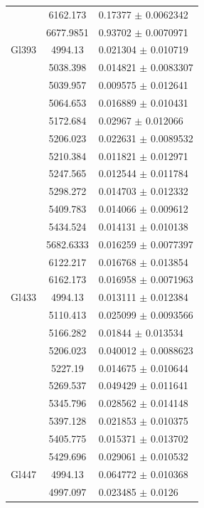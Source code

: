 \begin{longtable}{|c|c|l|}
 & 6162.173 & 0.17377 $\pm$ 0.0062342 \\        
 & 6677.9851 & 0.93702 $\pm$ 0.0070971 \\       
\hline                                          
Gl393 & 4994.13 & 0.021304 $\pm$ 0.010719 \\    
 & 5038.398 & 0.014821 $\pm$ 0.0083307 \\       
 & 5039.957 & 0.009575 $\pm$ 0.012641 \\        
 & 5064.653 & 0.016889 $\pm$ 0.010431 \\        
 & 5172.684 & 0.02967 $\pm$ 0.012066 \\         
 & 5206.023 & 0.022631 $\pm$ 0.0089532 \\       
 & 5210.384 & 0.011821 $\pm$ 0.012971 \\        
 & 5247.565 & 0.012544 $\pm$ 0.011784 \\        
 & 5298.272 & 0.014703 $\pm$ 0.012332 \\        
 & 5409.783 & 0.014066 $\pm$ 0.009612 \\        
 & 5434.524 & 0.014131 $\pm$ 0.010138 \\        
 & 5682.6333 & 0.016259 $\pm$ 0.0077397 \\      
 & 6122.217 & 0.016768 $\pm$ 0.013854 \\        
 & 6162.173 & 0.016958 $\pm$ 0.0071963 \\       
\hline                                          
Gl433 & 4994.13 & 0.013111 $\pm$ 0.012384 \\    
 & 5110.413 & 0.025099 $\pm$ 0.0093566 \\       
 & 5166.282 & 0.01844 $\pm$ 0.013534 \\         
 & 5206.023 & 0.040012 $\pm$ 0.0088623 \\       
 & 5227.19 & 0.014675 $\pm$ 0.010644 \\         
 & 5269.537 & 0.049429 $\pm$ 0.011641 \\        
 & 5345.796 & 0.028562 $\pm$ 0.014148 \\        
 & 5397.128 & 0.021853 $\pm$ 0.010375 \\        
 & 5405.775 & 0.015371 $\pm$ 0.013702 \\        
 & 5429.696 & 0.029061 $\pm$ 0.010532 \\        
\hline                                          
Gl447 & 4994.13 & 0.064772 $\pm$ 0.010368 \\    
 & 4997.097 & 0.023485 $\pm$ 0.0126 \\          

\end{longtable}
